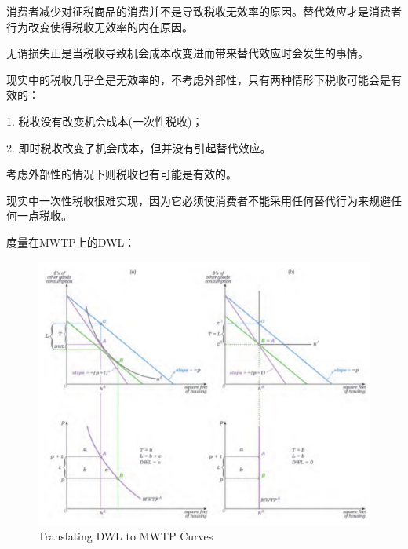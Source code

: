 \documentclass{article}
\begin{document}
消费者减少对征税商品的消费并不是导致税收无效率的原因。替代效应才是消费者行为改变使得税收无效率的内在原因。

无谓损失正是当税收导致机会成本改变进而带来替代效应时会发生的事情。

\hspace*{\fill}

现实中的税收几乎全是无效率的，不考虑外部性，只有两种情形下税收可能会是有效的：

1. 税收没有改变机会成本(一次性税收)；

2. 即时税收改变了机会成本，但并没有引起替代效应。

考虑外部性的情况下则税收也有可能是有效的。

\hspace*{\fill}

现实中一次性税收很难实现，因为它必须使消费者不能采用任何替代行为来规避任何一点税收。

\hspace*{\fill}

度量在MWTP上的DWL：

\begin{figure}[H] %
	\centering %
	\includegraphics[width=1\textwidth]{DWL_2} %
	\caption{Translating DWL to MWTP Curves} %
	\label{Fig.main4} %
\end{figure}

\hspace*{\fill}
\end{document}
